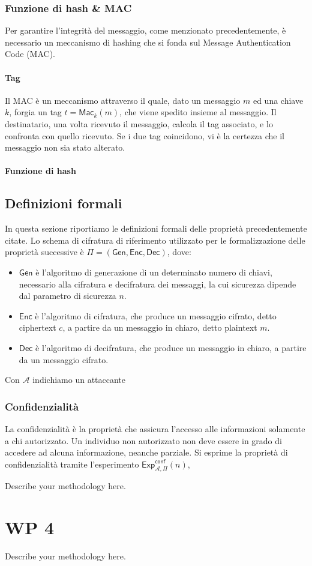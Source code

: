 \documentclass[a4paper,12pt]{article}
\begin{document}
\subsubsection{Funzione di hash \& MAC}
Per garantire l'integrità del messaggio, come menzionato precedentemente, è necessario un meccanismo di hashing che si fonda sul Message Authentication Code (MAC).
\paragraph{Tag}
Il MAC è un meccanismo attraverso il quale, dato un messaggio $m$ ed una chiave $k$, forgia un tag $t=\mathsf{Mac}_k(m)$, che viene spedito insieme al messaggio. Il destinatario, una volta ricevuto il messaggio, calcola il tag associato, e lo confronta con quello ricevuto. Se i due tag coincidono, vi è la certezza che il messaggio non sia stato alterato.
\paragraph{Funzione di hash}
\subsection{Definizioni formali}
In questa sezione riportiamo le definizioni formali delle proprietà precedentemente citate. 
\newline 
Lo schema di cifratura di riferimento utilizzato per le formalizzazione delle proprietà successive è $\Pi =\mathsf{(Gen,Enc,Dec)}$, dove: 
\begin{itemize}
    \item $\mathsf{Gen}$ è l'algoritmo di generazione di un determinato numero di chiavi, necessario alla cifratura e decifratura dei messaggi, la cui sicurezza dipende dal parametro di sicurezza $n$.
    \item $\mathsf{Enc}$ è l'algoritmo di cifratura, che produce un messaggio cifrato, detto ciphertext $c$, a partire da un messaggio in chiaro, detto plaintext $m$.
    \item $\mathsf{Dec}$ è l'algoritmo di decifratura, che produce un messaggio in chiaro, a partire da un messaggio cifrato.
\end{itemize}
Con $\mathcal{A}$ indichiamo un attaccante 

\subsubsection{Confidenzialità}
La confidenzialità è la proprietà che assicura l'accesso alle informazioni solamente a chi autorizzato. Un individuo non autorizzato non deve essere in grado di accedere ad alcuna informazione, neanche parziale. 
\newline Si esprime la proprietà di confidenzialità tramite l'esperimento $\mathsf{Exp}_{\mathcal A,\Pi}^\mathsf{conf}(n)$,

Describe your methodology here.
\newpage
\section{WP 4}
Describe your methodology here.
\end{document}
